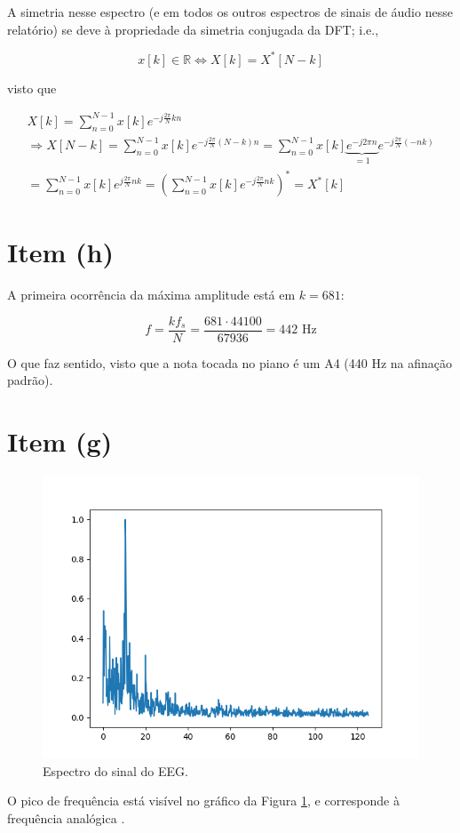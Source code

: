 \documentclass{article}
\begin{document}
A simetria nesse espectro (e em todos os outros espectros de sinais de áudio nesse relatório) se deve à propriedade da simetria conjugada da DFT; i.e.,

\begin{equation*}
    x[k] \in \mathbb{R} \Leftrightarrow X[k] = X^*[N-k]
\end{equation*}

visto que

\begin{gather*}
    X[k] = \sum_{n=0}^{N-1} x[k] e^{-j\frac{2\pi}{N}kn} \\
    \Rightarrow
    X[N-k] = \sum_{n=0}^{N-1} x[k] e^{-j\frac{2\pi}{N}(N-k)n} 
    = \sum_{n=0}^{N-1} x[k] \underbrace{e^{-j2\pi n}}_{=1} e^{-j\frac{2\pi}{N}(-nk)} \\
    = \sum_{n=0}^{N-1} x[k] e^{j\frac{2\pi}{N}nk}
    = \left(\sum_{n=0}^{N-1} x[k] e^{-j\frac{2\pi}{N}nk}\right)^*
    = X^*[k]
\end{gather*}

\section*{Item (h)}

A primeira ocorrência da máxima amplitude está em $k = 681$:

\begin{equation*}
    f = \frac{kf_s}{N} = \frac{681 \cdot 44100}{67936} = 442 \text{ Hz}
\end{equation*}

O que faz sentido, visto que a nota tocada no piano é um A4 (440 Hz na afinação padrão).

\section*{Item (g)}
\FloatBarrier
\begin{figure}[!ht]
    \centering
    \includegraphics[width=\linewidth]{images/eeg_spectrum.png}
    \caption{Espectro do sinal do EEG.}
    \label{eeg_graph}
\end{figure}

O pico de frequência está visível no gráfico da Figura \ref{eeg_graph}, e corresponde à frequência analógica .
\end{document}

